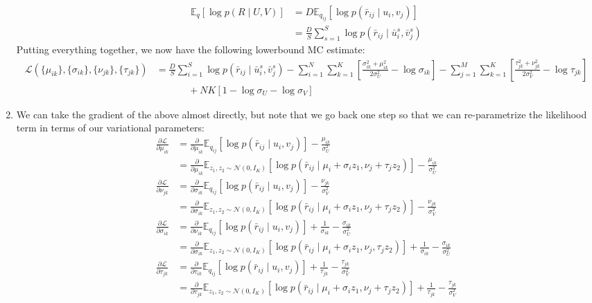 \documentclass{harvardml}
\newcommand{\E}{\mathbb{E}}
\newcommand{\N}{\mathcal{N}}
\theoremstyle{plain}
\begin{document}
\begin{enumerate}
\begin{align*}
\E_q [\log p(R \mid U,V)] &= D \E_{q_{ij}} [\log p(\bar{r}_{ij} \mid u_i,v_j)] \\
&= \frac{D}{S} \sum_{s=1}^S \log p(\bar{r}_{ij} \mid \bar{u}^s_i, \bar{v}^s_j)
\end{align*}
Putting everything together, we now have the following lowerbound MC estimate:
\begin{align*}
\mathcal{L}(\{\mu_{ik}\}, \{\sigma_{ik} \}, \{\nu_{jk}\}, \{\tau_{jk} \}) &=  \frac{D}{S} \sum_{i=1}^S \log p(\bar{r}_{ij} \mid \bar{u}^s_i, \bar{v}^s_j) -\sum_{i=1}^N \sum_{k=1}^K \left[  \frac{\sigma_{ik}^2 + \mu_{ik}^2}{2\sigma_U^2} - \log \sigma_{ik}  \right] - \sum_{j=1}^M \sum_{k=1}^K \left[ \frac{\tau_{jk}^2 + \nu_{jk}^2}{2\sigma_V^2} - \log \tau_{jk} \right] \\
&~~~~~~~~~~~~~~~ + NK[1  -\log \sigma_U - \log \sigma_V]
\end{align*}

\item We can take the gradient of the above almost directly, but note that we go back one step so that we can re-parametrize the likelihood term in terms of our variational parameters:
\begin{align*}
\frac{\partial \mathcal{L}}{\partial \mu_{ik}} &= \frac{\partial }{\partial \mu_{ik}}\E_{q_{ij}} [\log p(\bar{r}_{ij} \mid u_i,v_j)] -\frac{\mu_{ik}}{\sigma_U^2} \\
&=  \frac{\partial}{\partial \mu_{ik}}\E_{z_1,z_2 \sim \N(0,I_K)} [\log p(\bar{r}_{ij} \mid \mu_{i} + \sigma_{i}z_1, \nu_j + \tau_j z_2)] -\frac{\mu_{ik}}{\sigma_U^2} \\
\frac{\partial \mathcal{L}}{\partial \nu_{jk}} &= \frac{\partial }{\partial \sigma_{ik}}\E_{q_{ij}} [\log p(\bar{r}_{ij} \mid u_i,v_j)] -\frac{\nu_{jk}}{\sigma_V^2} \\
&= \frac{\partial}{\partial \sigma_{ik} }\E_{z_1,z_2 \sim \N(0,I_K)} [\log p(\bar{r}_{ij} \mid \mu_{i} + \sigma_{i}z_1, \nu_j + \tau_j z_2)] -\frac{\nu_{jk}}{\sigma_V^2} \\
\frac{\partial \mathcal{L}}{\partial \sigma_{ik}} &= \frac{\partial }{\partial \nu_{ik}}\E_{q_{ij}} [\log p(\bar{r}_{ij} \mid u_i,v_j)] + \frac{1}{\sigma_{ik}} - \frac{\sigma_{ik}}{\sigma_U^2}\\
&= \frac{\partial}{\partial \sigma_{ik}}\E_{z_1,z_2 \sim \N(0,I_K)} [\log p(\bar{r}_{ij} \mid \mu_{i} + \sigma_{i} z_1, \nu_j, \tau_j z_2)]  + \frac{1}{\sigma_{ik}} - \frac{\sigma_{ik}}{\sigma_U^2}\\
\frac{\partial \mathcal{L}}{\partial \tau_{jk}} &= \frac{\partial }{\partial \tau_{ik}}\E_{q_{ij}} [\log p(\bar{r}_{ij} \mid u_i,v_j)] + \frac{1}{\tau_{jk}} - \frac{\tau_{jk}}{\sigma_V^2}\\
&= \frac{\partial}{\partial \tau_{jk}}\E_{z_1,z_2 \sim \N(0,I_K)} [\log p(\bar{r}_{ij} \mid \mu_{i} + \sigma_{i}z_1, \nu_j+ \tau_j z_2)]  + \frac{1}{\tau_{jk}} - \frac{\tau_{jk}}{\sigma_V^2}
\end{align*}


\end{enumerate}
\end{document}
